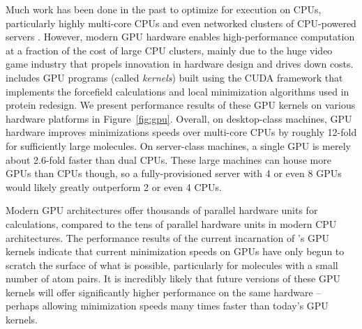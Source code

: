 Much work has been done in the past to optimize \osprey for execution on CPUs, particularly highly multi-core CPUs and even networked clusters of CPU-powered servers . However, modern GPU hardware enables high-performance computation at a fraction of the cost of large CPU clusters, mainly due to the huge video game industry that propels innovation in hardware design and drives down costs.  includes GPU programs (called {\it kernels}) built using the CUDA framework that implements the forcefield calculations and local minimization algorithms used in protein redesign. We present performance results of these GPU kernels on various hardware platforms in Figure~\ref{fig:gpu}. Overall, on desktop-class machines, GPU hardware improves minimizations speeds over multi-core CPUs by roughly 12-fold for sufficiently large molecules. On server-class machines, a single GPU is merely about 2.6-fold faster than dual CPUs. These large machines can house more GPUs than CPUs though, so a fully-provisioned server with 4 or even 8 GPUs would likely greatly outperform 2 or even 4 CPUs. 

Modern GPU architectures offer thousands of parallel hardware units for calculations, compared to the tens of parallel hardware units in modern CPU architectures. The performance results of the current incarnation of \osprey's GPU kernels indicate that current minimization speeds on GPUs have only begun to scratch the surface of what is possible, particularly for molecules with a small number of atom pairs. It is incredibly likely that future versions of these GPU kernels will offer significantly higher performance on the same hardware -- perhaps allowing minimization speeds many times faster than today's GPU kernels.

